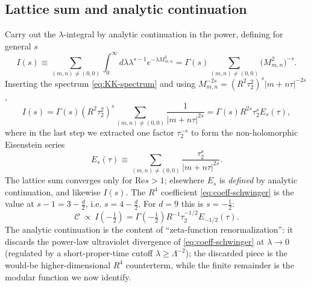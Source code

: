 \subsection*{Lattice sum and analytic continuation}
Carry out the $\lambda$-integral by analytic continuation in the power, defining for general $s$
\begin{equation}
I(s)\equiv\sum_{(m,n)\neq(0,0)}\int_0^\infty d\lambda \lambda^{ s-1} e^{-\lambda M_{m,n}^2}
=\Gamma(s)\sum_{(m,n)\neq(0,0)}\big(M_{m,n}^2\big)^{-s}.
\label{eq:I-gamma}
\end{equation}
Inserting the spectrum \eqref{eq:KK-spectrum} and using $M_{m,n}^{-2s}=(R^2\tau_2^2)^{s} |m+n\tau|^{-2s}$,
\begin{equation}
I(s)=\Gamma(s) (R^2\tau_2^2)^{s}\sum_{(m,n)\neq(0,0)}\frac{1}{|m+n\tau|^{2s}}
=\Gamma(s) R^{2s} \tau_2^{ s} E_s(\tau),
\label{eq:I-eisenstein}
\end{equation}
where in the last step we extracted one factor $\tau_2^{-s}$ to form the non-holomorphic Eisenstein series
\begin{equation}
E_s(\tau)\equiv\sum_{(m,n)\neq(0,0)}\frac{\tau_2^{ s}}{|m+n\tau|^{2s}}.
\label{eq:eisenstein-def}
\end{equation}
The lattice sum converges only for $\mathrm{Re} s>1$; elsewhere $E_s$ is \emph{defined} by analytic continuation, and likewise $I(s)$.
The $R^4$ coefficient \eqref{eq:coeff-schwinger} is the value at $s-1=3-\tfrac{d}{2}$, i.e. $s=4-\tfrac{d}{2}$.
For $d=9$ this is $s=-\tfrac12$:
\begin{equation}
\mathcal{C}\ \propto\ I\left(-\tfrac12\right)=\Gamma\left(-\tfrac12\right)R^{-1} \tau_2^{-1/2} E_{-1/2}(\tau).
\label{eq:C-as-Eminushalf}
\end{equation}
The analytic continuation is the content of ``zeta-function renormalization'': it discards the power-law ultraviolet divergence of \eqref{eq:coeff-schwinger} at $\lambda\to0$ (regulated by a short-proper-time cutoff $\lambda\geq\Lambda^{-2}$); the discarded piece is the would-be higher-dimensional $R^4$ counterterm, while the finite remainder is the modular function we now identify.

